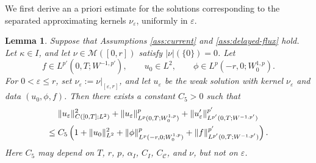 \documentclass[a4paper,11pt,oneside,reqno]{amsart}
\newtheorem{lemma}[theorem]{Lemma}
\newcounter{c}
\newcounter{d}
\newcounter{b}
\newcommand{\e}{\varepsilon}
\newcommand{\M}{\mathcal{M}}
\begin{document}
We first derive an a priori estimate for the solutions corresponding to the
separated approximating kernels \(\nu_\e\), uniformly in \(\e\).

\begin{lemma}\label{lem:uniform-truncation-estimate}
Suppose that Assumptions \ref{ass:current} and \ref{ass:delayed-flux} hold.
Let \(\kappa\in I\), and let \(\nu\in\M([0,r])\) satisfy $|\nu|(\{0\})=0$.
Let
\[
 f\in L^{p'}(0,T;W^{-1,p'}),\qquad
 u_0\in L^2,\qquad
 \phi\in L^p(-r,0;W^{1,p}_0).
\]
For \(0<\e\le r\), set $ \nu_\e:=\nu|_{[\e,r]}$,
and let \(u_\e\) be the weak solution with kernel
\(\nu_\e\) and data \((u_0,\phi,f)\).  Then there exists a constant
\(C_5>0\) such that
\begin{align}
 &\|u_\e\|_{C([0,T];L^2)}^2
 +\|u_\e\|_{L^p(0,T;W^{1,p}_0)}^p
 +\|u_\e'\|_{L^{p'}(0,T;W^{-1,p'})}^{p'}
 \notag\\
 \le{}&
 C_5\left(
 1+\|u_0\|_{L^2}^2
 +\|\phi\|_{L^p(-r,0;W^{1,p}_0)}^p
 +\|f\|_{L^{p'}(0,T;W^{-1,p'})}^{p'}
 \right).
 \label{eq:uniform-truncation-estimate}
\end{align}
Here \(C_5\) may depend on \(T\), \(r\), \(p\), \(\alpha_I\), \(C_I\),
\(C_{\mathcal C}\), and \(\nu\), but not on \(\e\).
\end{lemma}
\end{document}
